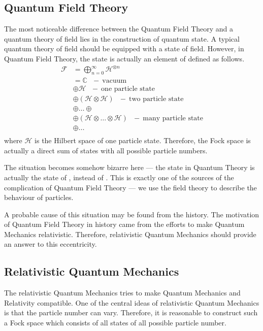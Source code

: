 \documentclass[letterpaper,10pt,english]{sphinxmanual}
\begin{document}
\subsection{Quantum Field Theory}
\label{\detokenize{theo_what:quantum-field-theory}}
The most noticeable difference between the Quantum Field Theory and a quantum theory of field lies in the construction of quantum state. A typical quantum theory of field should be equipped with a state of field. However, in Quantum Field Theory, the state is actually an element of  defined as follows.
\begin{equation*}
\begin{split}\mathcal{F} &= \bigoplus_{n=0}^\infty\mathcal{H}^{\otimes n}\\
&= \mathbb{C}\ \ \ -\ \text{vacuum}\\
&\oplus \mathcal{H}\ \ \ -\ \text{one particle state}\\
&\oplus (\mathcal{H}\otimes\mathcal{H})\ \ \ - \ \text{two particle state}\\
&\oplus\ldots\oplus\\
&\oplus (\mathcal{H}\otimes\ldots\otimes\mathcal{H})\ \ \ -\ \text{many particle state}\\
&\oplus\ldots\\\end{split}
\end{equation*}
where \(\mathcal{H}\) is the Hilbert space of one particle state. Therefore, the Fock space is actually a direct sum of states with all possible particle numbers.

The situation becomes somehow bizarre here --- the state in Quantum  Theory is actually the state of , instead of . This is exactly one of the sources of the complication of Quantum Field Theory --- we use the field theory to describe the behaviour of particles.

A probable cause of this situation may be found from the history. The motivation of Quantum Field Theory in history came from the efforts to make Quantum Mechanics relativistic. Therefore, relativistic Quantum Mechanics should provide an answer to this eccentricity.


\subsection{Relativistic Quantum Mechanics}
\label{\detokenize{theo_what:relativistic-quantum-mechanics}}
The relativistic Quantum Mechanics tries to make Quantum Mechanics and  Relativity compatible. One of the central ideas of relativistic Quantum Mechanics is that the particle number can vary. Therefore, it is reasonable to construct such a Fock space which consists of all states of all possible particle number.
\end{document}
